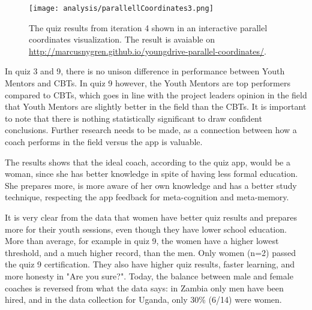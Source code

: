 \begin{figure}[h]
    \centering
    \texttt{[image: analysis/parallellCoordinates3.png]}
    \caption{The quiz results from iteration 4 shown in an interactive parallel coordinates visualization. The result is avaiable on \url{http://marcusnygren.github.io/youngdrive-parallel-coordinates/}.}
    \label{fig:parallellCoordinates3}
\end{figure}

\clearpage



In quiz 3 and 9, there is no unison difference in performance between Youth Mentors and CBTs. In quiz 9 however, the Youth Mentors are top performers compared to CBTs, which goes in line with the project leaders opinion in the field that Youth Mentors are slightly better in the field than the CBTs. It is important to note that there is nothing statistically significant to draw confident conclusions. Further research needs to be made, as a connection between how a coach performs in the field versus the app is valuable. %



The results shows that the ideal coach, according to the quiz app, would be a woman, since she has better knowledge in spite of having less formal education. She prepares more, is more aware of her own knowledge and has a better study technique, respecting the app feedback for meta-cognition and meta-memory.

It is very clear from the data that women have better quiz results and prepares more for their youth sessions, even though they have lower school education. More than average, for example in quiz 9, the women have a higher lowest threshold, and a much higher record, than the men. Only women (n=2) passed the quiz 9 certification. They also have higher quiz results, faster learning, and more honesty in "Are you sure?". Today, the balance between male and female coaches is reversed from what the data says: in Zambia only men have been hired, and in the data collection for Uganda, only 30\% (6/14) were women.

